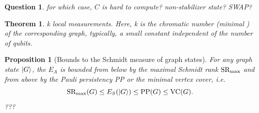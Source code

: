 \documentclass[
10pt,
aps,
pra,
linenumbers,
floatfix,
]{revtex4-2}
\theoremstyle{plain}
\newtheorem{theorem}{Theorem}
\newtheorem{proposition}{Proposition}
\newtheorem{question}{Question}
\theoremstyle{definition}
\begin{document}
\begin{question}
	for which case, $C$ is hard to compute? non-stabilizer state? SWAP?
\end{question}
\begin{theorem}
	k local measurements. Here, k is the chromatic number (minimal ) of the corresponding graph, typically, a small constant independent of the number of qubits.
\end{theorem}
\begin{proposition}[Bounds to the Schmidt measure of graph states]
	For any graph state $\ket{G}$, the  $E_A$ is bounded from below by the maximal Schmidt rank $\textup{SR}_{\max}$ and from above by the Pauli persistency PP or the minimal vertex cover, i.e.
	\begin{equation}
		\textup{SR}_{\max} (G) \le E_S(\ket{G}) \le \textup{PP}(G) \le \textup{VC}(G).
	\end{equation}
	???
\end{proposition}
\end{document}
